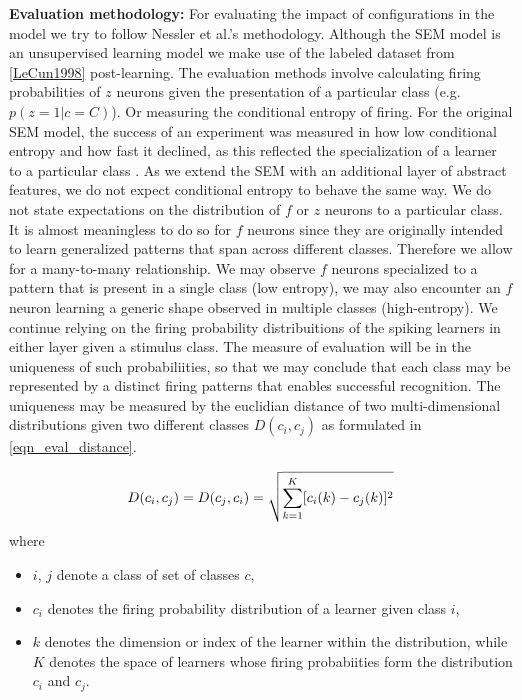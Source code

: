 \documentclass{report}
\begin{document}
\textbf{Evaluation methodology:} For evaluating the impact of configurations in the model we try to follow Nessler et al.'s methodology. Although the SEM model is an unsupervised learning model we make use of the labeled dataset from \cref{LeCun1998} post-learning. The evaluation methods involve calculating firing probabilities of $z$ neurons given the presentation of a particular class (e.g. $p(z=1|c=C)$). Or measuring the conditional entropy of firing. For the original SEM model, the success of an experiment was measured in how low conditional entropy and how fast it declined, as this reflected the specialization of a learner to a particular class \cite{Nessler2010}. As we extend the SEM with an additional layer of abstract features, we do not expect conditional entropy to behave the same way. We do not state expectations on the distribution of $f$ or $z$ neurons to a particular class. It is almost meaningless to do so for $f$ neurons since they are originally intended to learn generalized patterns that span across different classes. Therefore we allow for a many-to-many relationship. We may observe $f$ neurons specialized to a pattern that is present in a single class (low entropy), we may also encounter an $f$ neuron learning a generic shape observed in multiple classes (high-entropy). We continue relying on the firing probability distribuitions of the spiking learners in either layer given a stimulus class. The measure of evaluation will be in the uniqueness of such probabiliities, so that we may conclude that each class may be represented by a distinct firing patterns that enables successful recognition. The uniqueness may be measured by the euclidian distance of two multi-dimensional distributions given two different classes $D(c_i, c_j)$ as formulated in \ref{eqn_eval_distance}.

\begin{equation}
		D(c_i, c_j) = D(c_j, c_i) = \sqrt{\sum_{k=1}^{K} [c_i(k)-c_j(k)]^2} \\
	\label{eqn_eval_distance}
\end{equation}
where
\begin{itemize}
	\item $i$, $j$ denote a class of set of classes $c$,
  \item $c_i$ denotes the firing probability distribution of a learner given class $i$,
  \item $k$ denotes the dimension or index of the learner within the distribution, while $K$ denotes the space of learners whose firing probabiities form the distribution $c_i$ and $c_j$.
\end{itemize}
\end{document}
